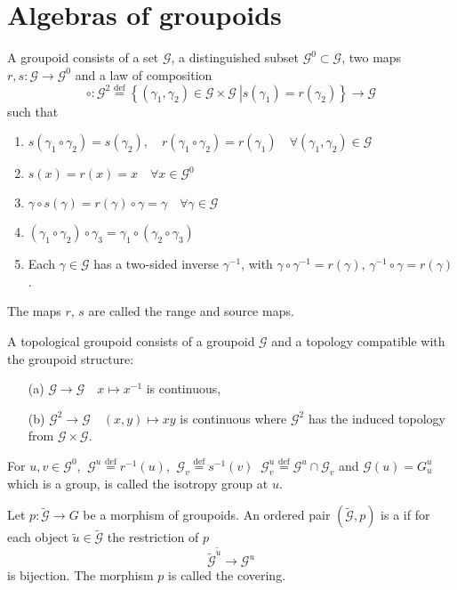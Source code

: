 \documentclass{beamer}
\theoremstyle{plain}
\newcommand{\G}{\mathcal{G}}
\newcommand{\ga}{\gamma}
\newcommand{\bydef}{\stackrel{\mathrm{def}}{=}}
\begin{document}
\section{Algebras of groupoids}
\begin{frame}
	\begin{definition}
	A \alert{groupoid} consists of a set $\G$, a distinguished subset $\G^0\subset\G$, two maps
	$r, s : \G\to \G^0$ and a law of composition
	$$
	\circ: \G^2\bydef\left\{\left.\left(\ga_1,\ga_2 \right) \in \G\times\G~\right| s\left(\ga_1\right)= r\left(\ga_2\right)\right\}\to \G
	$$
	such that
	\begin{enumerate}
		\item $s\left(\ga_1\circ\ga_2\right)=s\left(\ga_2\right), \quad r\left(\ga_1\circ\ga_2\right)=r\left(\ga_1\right)\quad \forall\left(\ga_1, \ga_2 \right) \in \G$
		\item $s\left(x\right)=r\left(x\right)=x \quad\forall x\in\G^0$
		\item $\ga\circ s\left(\ga\right)= r\left(\ga\right)\circ\ga = \ga\quad \forall\ga\in\G$
		\item $\left( \ga_1\circ\ga_2\right) \circ\ga_3=\ga_1\circ\left( \ga_2\circ\ga_3\right) $
		\item Each $\ga \in\G$ has a two-sided inverse $\ga^{-1}$, with $\ga\circ\ga^{-1}=r\left(\ga\right)$, $\ga^{-1}\circ\ga=r\left(\ga\right)$.
	\end{enumerate}
	The maps $r$, $s$ are called the \alert{range} and \alert{source} maps.
\end{definition}

\end{frame}
\begin{frame}
		\begin{definition}\label{groupoid_topological_defn}
		A \alert{topological groupoid} consists of a groupoid $\G$ and a topology compatible with the groupoid structure:
		\begin{enumerate}
			\item [(a)] $\G \to \G \quad x \mapsto x^{-1}$ is continuous,
			\item [(b)] $\G^2\to \G\quad \left(x,y\right)\mapsto xy$ is continuous where $\G^2$ has the induced topology from $\G \times \G$.
		\end{enumerate}
	\end{definition}
\begin{definition}
	For $u, v\in \G^0$, $~\G^u\bydef r^{-1}\left( u\right)$,  $~\G_v\bydef s^{-1}\left( v\right)$  $~\G^u_v\bydef \G^u\cap \G_v$ and
	$\G(u) = G^u_u$ which is a group, is called  the \alert{isotropy  group} at $u$.
\end{definition}
	
\begin{definition}\label{groupoid_covering_defn}
	Let $p : \widetilde{\G}\to G$ be a morphism of groupoids. An ordered pair
	$\left( \widetilde{\G}, p\right)$ is a  if for each object $\widetilde u \in \widetilde{\G}$ the restriction of $p$
	$$
	\widetilde{\G}^{\widetilde{u}}\to {\G}^u
	$$
	is bijection. The morphism $p$ is called the \alert{covering}. 
\end{definition}
\end{frame}
\end{document}
